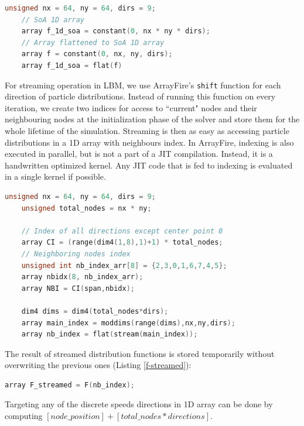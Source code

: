 \begin{lstlisting}[language=Cpp, caption=Creating SoA structure representation of D2Q9 lattice with ArrayFire in C++.]
	unsigned nx = 64, ny = 64, dirs = 9;
	// SoA 1D array
	array f_1d_soa = constant(0, nx * ny * dirs);
	// Array flattened to SoA 1D array
	array f = constant(0, nx, ny, dirs);
	array f_1d_soa = flat(f)
\end{lstlisting}

For streaming operation in LBM, we use ArrayFire's \texttt{shift} function for each direction of particle distributions. Instead of running this function on every iteration, we create two indices for access to ``current" nodes and their neighbouring nodes at the initialization phase of the solver and store them for the whole lifetime of the simulation. Streaming is then as easy as accessing particle distributions in a 1D array with neighbours index. In ArrayFire, indexing is also executed in parallel, but is not a part of a JIT compilation. Instead, it is a handwritten optimized kernel. Any JIT code that is fed to indexing is evaluated in a single kernel if possible.

\begin{lstlisting}[language=Cpp, caption=Creating ``current" (or main) index and neighboring index.]
	unsigned nx = 64, ny = 64, dirs = 9;
	unsigned total_nodes = nx * ny;
	
	// Index of all directions except center point 0
	array CI = (range(dim4(1,8),1)+1) * total_nodes;
	// Neighboring nodes index
	unsigned int nb_index_arr[8] = {2,3,0,1,6,7,4,5};
	array nbidx(8, nb_index_arr);
	array NBI = CI(span,nbidx);
	
	dim4 dims = dim4(total_nodes*dirs);
	array main_index = moddims(range(dims),nx,ny,dirs);
	array nb_index = flat(stream(main_index));
\end{lstlisting}

The result of streamed distribution functions is stored temporarily without overwriting the previous ones (Listing \ref{f-streamed}):

\begin{lstlisting}[language=Cpp, caption=Streaming step., label=f-streamed]
	array F_streamed = F(nb_index);
\end{lstlisting}

Targeting any of the discrete speeds directions in 1D array can be done by computing $[node\_position] + [total\_nodes * directions]$. 

